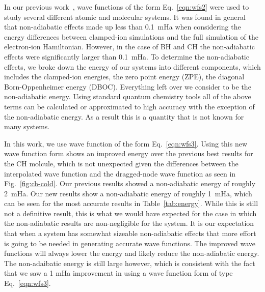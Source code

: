 \documentclass[aip,jcp,numerical,reprint]{revtex4-1}
\begin{document}
In our previous work~\cite{Yang2015}, wave functions of the form Eq.~\eqref{eqn:wfs2} were used to study several different atomic and molecular systems.  It was found in general that non-adiabatic effects made up less than 0.1~mHa when considering the energy differences between clamped-ion simulations and the full simulation of the electron-ion Hamiltonian.   However, in the case of BH and CH the non-adiabatic effects were  significantly larger than 0.1~mHa.  To determine the non-adiabatic effects, we broke down the energy of our systems into different components, which includes the clamped-ion energies, the zero point energy (ZPE), the diagonal Born-Oppenheimer energy (DBOC).   Everything left over we consider to be the non-adiabatic energy.   Using standard quantum chemistry tools all of the above terms can be calculated or approximated to high accuracy with the exception of the non-adiabatic energy.  As a result this is a quantity that is not known for many systems.  %

In this work, we use wave function of the form Eq.~\eqref{eqn:wfs3}. Using this new wave function form shows an improved energy over the previous best results for the CH molcule, which is not unexpected given the differences between the interpolated wave function and the dragged-node wave function as seen in Fig.~\ref{fig:ch-cold}. Our previous results showed a non-adiabatic energy of roughly 2~mHa. Our new results show a non-adiabatic energy of roughly 1~mHa, which can be seen for the most accurate results in Table~\ref{tab:energy}.  While this is still not a definitive result, this is what we would have expected for the case in which the non-adiabatic results are non-negligible for the system.  It is our expectation that when a system has somewhat sizeable non-adiabatic effects that more effort is going to be needed in generating accurate wave functions.  The improved wave functions will always lower the energy and likely reduce the non-adiabatic energy.  The non-adaibatic energy is still large however, which is consistent with the fact that we saw a 1 mHa improvement in using a wave function form of type Eq.~\eqref{eqn:wfs3}.
\end{document}
